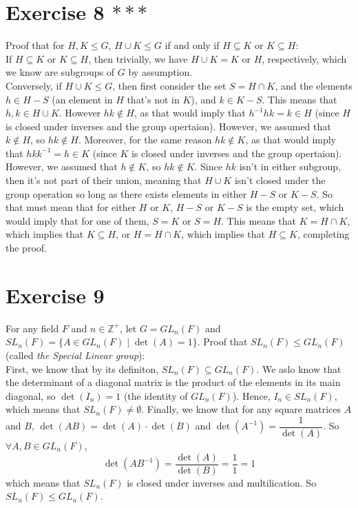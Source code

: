 \documentclass{article}
\newcommand{\Z}{\mathbb{Z}}
\begin{document}
    \section*{Exercise 8 $***$}
    Proof that for $H, K \leqslant G$,
    $H \cup K \leqslant G$
    if and only if $H \subseteq K$ or  $K \subseteq H$: \\
    If $H \subseteq K$ or $K \subseteq H$,
    then trivially, we have $H \cup K = K$ or $H$, respectively,
    which we know are subgroups of $G$ by assumption. \\
    Conversely, if $H \cup K \leqslant G$,
    then first consider the set $S = H \cap K$,
    and the elements $h \in H - S$
    (an element in $H$ that's not in $K$),
    and $k \in K - S$.
    This means that $h, k \in H \cup K$.
    However $hk \notin H$,
    as that would imply that $h^{-1}hk = k \in H$
    (since $H$ is closed under inverses and the group opertaion).
    However, we assumed that $k \notin H$,
    so $hk \notin H$.
    Moreover, for the same reason $hk \notin K$,
    as that would imply that $hkk^{-1} = h \in K$
    (since $K$ is closed under inverses and the group opertaion).
    However, we assumed that $h \notin K$,
    so $hk \notin K$.
    Since $hk$ isn't in either subgroup,
    then it's not part of their union, meaning that $H \cup K$
    isn't closed under the group operation so long as
    there exists elements in either $H - S$ or $K - S$.
    So that must mean that for either $H$ or $K$,
    $H - S$ or $K - S$ is the empty set,
    which would imply that for one of them, $S = K$ or $S = H$.
    This means that $K = H \cap K$,
    which implies that $K \subseteq H$,
    or $H = H \cap K$,
    which implies that $H \subseteq K$,
    completing the proof.


    \section*{Exercise 9}
    For any field $F$ and $n \in \Z^+$,
    let $G = GL_n(F)$ and $SL_n(F) = \{A \in GL_n(F) \mid \det(A) = 1\}$.
    Proof that $SL_n(F) \leqslant GL_n(F)$
    (called \textit{the Special Linear group}): \\
    First, we know that by its definiton, $SL_n(F) \subseteq GL_n(F)$.
    We aslo know that the determinant of a diagonal matrix is the product
    of the elements in its main diagonal,
    so $\det(I_n) = 1$ (the identity of $GL_n(F)$).
    Hence, $I_n \in SL_n(F)$,
    which means that $SL_n(F) \neq \emptyset$.
    Finally, we know that for any square matrices $A$ and $B$,
    $\det(AB) = \det(A) \cdot \det(B)$
    and $\det(A^{-1}) = \dfrac{1}{\det(A)}$.
    So $\forall A, B \in GL_n(F)$,
    \[\det(AB^{-1}) = \dfrac{\det(A)}{\det(B)} = \dfrac{1}{1} = 1\]
    which means that $SL_n(F)$ is closed under inverses and multilication.
    So $SL_n(F) \leqslant GL_n(F)$.
\end{document}
